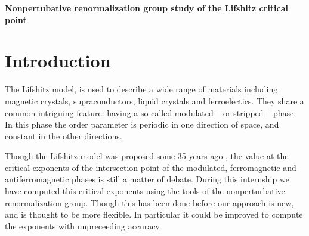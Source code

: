 %
%

\pagebreak

\begin{center}
\Huge \textbf{Nonpertubative renormalization group study of the Lifshitz critical point}
\end{center}


\section*{\Huge{Introduction}}

The Lifshitz model, is used to describe a wide range of materials including magnetic crystals, supraconductors, liquid crystals and ferroelectics. 
They share a common intriguing feature: having a so called modulated -- or stripped -- phase. In this phase the order parameter is periodic in one direction of space, and constant in the other directions. 

Though the Lifshitz model was proposed some 35 years ago \cite{Hornreich}, the value at the critical exponents of the intersection point of the modulated, ferromagnetic and antiferromagnetic phases is still a matter of debate. During this internship we have computed this critical exponents using the tools of the nonperturbative renormalization group. Though this has been done before \cite{MouhannaLif} \cite{BervillierLif} our approach is new, and is thought to be more flexible. In particular it could be improved to compute the exponents with unpreceeding accuracy.

